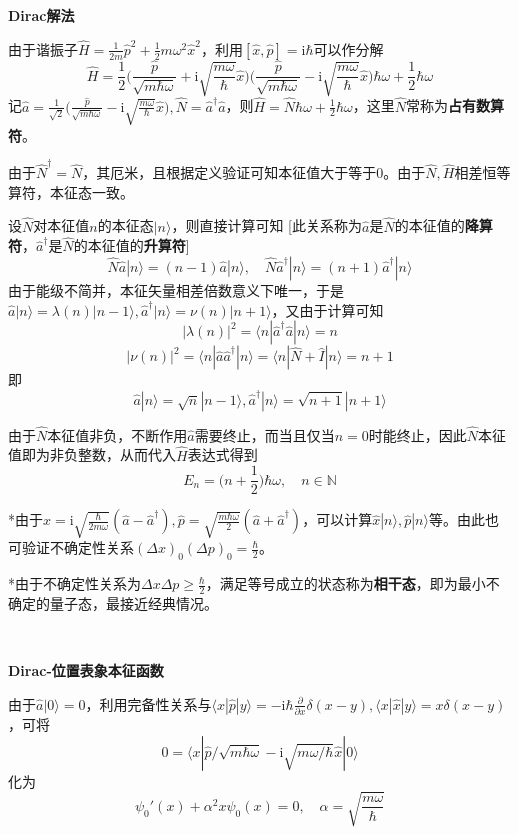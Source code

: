 \documentclass[a4paper,UTF8,fontset=windows]{ctexart}
\newcommand*{\ir}{\mathrm{i}}
\newcommand*{\ket}[1]{|#1\rangle}
\newcommand*{\blk}[3]{\langle#1|#2|#3\rangle}
\begin{document}
\textbf{Dirac解法}

由于谐振子$\hat{H}=\frac{1}{2m}\hat{p}^2+\frac{1}{2}m\omega^2\hat{x}^2$，利用$[\hat{x},\hat{p}]=\ir\hbar$可以作分解
$$\hat{H}=\frac{1}{2}\bigg(\frac{\hat{p}}{\sqrt{m\hbar\omega}}+\ir\sqrt{\frac{m\omega}{\hbar}}\hat{x}\bigg)\bigg(\frac{\hat{p}}{\sqrt{m\hbar\omega}}-\ir\sqrt{\frac{m\omega}{\hbar}}\hat{x}\bigg)\hbar\omega+\frac{1}{2}\hbar\omega$$
记$\hat{a}=\frac{1}{\sqrt2}\big(\frac{\hat{p}}{\sqrt{m\hbar\omega}}-\ir\sqrt{\frac{m\omega}{\hbar}}\hat{x}\big),\hat{N}=\hat{a}^\dagger\hat{a}$，则$\hat{H}=\hat{N}\hbar\omega+\frac{1}{2}\hbar\omega$，这里$\hat{N}$常称为\textbf{占有数算符}。

由于$\hat{N}^\dagger=\hat{N}$，其厄米，且根据定义验证可知本征值大于等于0。由于$\hat{N},\hat{H}$相差恒等算符，本征态一致。

设$\hat{N}$对本征值$n$的本征态$\ket{n}$，则直接计算可知
[此关系称为$\hat{a}$是$\hat{N}$的本征值的\textbf{降算符}，$\hat{a}^\dagger$是$\hat{N}$的本征值的\textbf{升算符}]
$$\hat{N}\hat{a}\ket{n}=(n-1)\hat{a}\ket{n},\quad\hat{N}\hat{a}^\dagger\ket{n}=(n+1)\hat{a}^\dagger\ket{n}$$
由于能级不简并，本征矢量相差倍数意义下唯一，于是$\hat{a}\ket{n}=\lambda(n)\ket{n-1},\hat{a}^\dagger\ket{n}=\nu(n)\ket{n+1}$，又由于计算可知
$$|\lambda(n)|^2=\blk{n}{\hat{a}^\dagger\hat{a}}{n}=n$$
$$|\nu(n)|^2=\blk{n}{\hat{a}\hat{a}^\dagger}{n}=\blk{n}{\hat{N}+\hat{I}}{n}=n+1$$
即
$$\hat{a}\ket{n}=\sqrt{n}\ket{n-1},\hat{a}^\dagger\ket{n}=\sqrt{n+1}\ket{n+1}$$

由于$\hat{N}$本征值非负，不断作用$\hat{a}$需要终止，而当且仅当$n=0$时能终止，因此$\hat{N}$本征值即为非负整数，从而代入$\hat{H}$表达式得到
$$E_n=\bigg(n+\frac{1}{2}\bigg)\hbar\omega,\quad n\in\mathbb{N}$$

*由于$\hat{x}=\ir\sqrt{\frac{\hbar}{2m\omega}}(\hat{a}-\hat{a}^\dagger),\hat{p}=\sqrt{\frac{m\hbar\omega}{2}}(\hat{a}+\hat{a}^\dagger)$，可以计算$\hat{x}\ket{n},\hat{p}\ket{n}$等。由此也可验证不确定性关系$(\Delta x)_0(\Delta p)_0=\frac{\hbar}{2}$。

*由于不确定性关系为$\Delta x\Delta p\ge\frac{\hbar}{2}$，满足等号成立的状态称为\textbf{相干态}，即为最小不确定的量子态，最接近经典情况。

\

\textbf{Dirac-位置表象本征函数}

由于$\hat{a}\ket{0}=0$，利用完备性关系与$\blk{x}{\hat{p}}{y}=-\ir\hbar\frac{\partial}{\partial x}\delta(x-y),\blk{x}{\hat{x}}{y}=x\delta(x-y)$，可将
$$0=\blk{x}{\hat{p}/\sqrt{m\hbar\omega}-\ir\sqrt{m\omega/\hbar}\hat{x}}{0}$$
化为
$$\psi_0'(x)+\alpha^2x\psi_0(x)=0,\quad\alpha=\sqrt{\frac{m\omega}{\hbar}}$$
\end{document}
